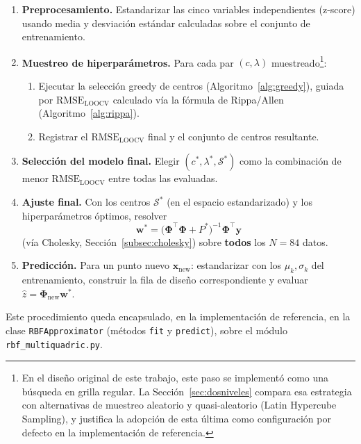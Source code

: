 \documentclass[11pt,a4paper]{article}
\newcommand{\Phimat}{\boldsymbol{\Phi}}
\newcommand{\wvec}{\mathbf{w}}
\newcommand{\yvec}{\mathbf{y}}
\begin{document}
\begin{enumerate}
    \item \textbf{Preprocesamiento.} Estandarizar las cinco variables
    independientes (z-score) usando media y desviaci\'on est\'andar
    calculadas sobre el conjunto de entrenamiento.

    \item \textbf{Muestreo de hiperpar\'ametros.} Para cada par $(c,\lambda)$
    muestreado\footnote{En el dise\~no original de este trabajo, este paso se
    implement\'o como una b\'usqueda en grilla regular. La
    Secci\'on~\ref{sec:dosniveles} compara esa estrategia con alternativas de
    muestreo aleatorio y quasi-aleatorio (Latin Hypercube Sampling), y
    justifica la adopci\'on de esta \'ultima como configuraci\'on por defecto
    en la implementaci\'on de referencia.}:
    \begin{enumerate}
        \item Ejecutar la selecci\'on greedy de centros
        (Algoritmo~\ref{alg:greedy}), guiada por $\text{RMSE}_{\text{LOOCV}}$
        calculado v\'ia la f\'ormula de Rippa/Allen (Algoritmo~\ref{alg:rippa}).
        \item Registrar el $\text{RMSE}_{\text{LOOCV}}$ final y el conjunto de
        centros resultante.
    \end{enumerate}

    \item \textbf{Selecci\'on del modelo final.} Elegir $(c^\ast,\lambda^\ast,
    \mathcal S^\ast)$ como la combinaci\'on de menor $\text{RMSE}_{\text{LOOCV}}$
    entre todas las evaluadas.

    \item \textbf{Ajuste final.} Con los centros $\mathcal S^\ast$ (en el
    espacio estandarizado) y los hiperpar\'ametros \'optimos, resolver
    \[
    \wvec^\ast = \big(\Phimat^{\!\top}\Phimat + P^\ast\big)^{-1}
    \Phimat^{\!\top}\yvec
    \]
    (v\'ia Cholesky, Secci\'on~\ref{subsec:cholesky}) sobre \textbf{todos} los
    $N=84$ datos.

    \item \textbf{Predicci\'on.} Para un punto nuevo $\mathbf x_{\text{new}}$:
    estandarizar con los $\mu_k,\sigma_k$ del entrenamiento, construir la fila
    de dise\~no correspondiente y evaluar $\hat z = \Phimat_{\text{new}}
    \wvec^\ast$.
\end{enumerate}

Este procedimiento queda encapsulado, en la implementaci\'on de referencia, en
la clase \texttt{RBFApproximator} (m\'etodos \texttt{fit} y \texttt{predict}),
sobre el m\'odulo \texttt{rbf\_multiquadric.py}.
\end{document}
